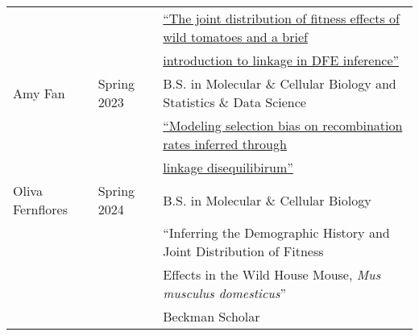 \documentclass[11pt]{article}
\begin{document}
\begin{longtable}[l]{l l l}
&& \href{https://repository.arizona.edu/handle/10150/651036}{``The joint distribution of fitness effects of wild tomatoes and a brief}\\
&& \href{https://repository.arizona.edu/handle/10150/651036}{introduction to linkage in DFE inference''}\\
Amy Fan & Spring 2023 & B.S. in Molecular \& Cellular Biology and Statistics \& Data Science\\
&&\href{https://repository.arizona.edu/handle/10150/669879}{``Modeling selection bias on recombination rates inferred through}\\
&&\href{https://repository.arizona.edu/handle/10150/669879}{linkage disequilibirum''}\\
Oliva Fernflores & Spring 2024 & B.S. in Molecular \& Cellular Biology\\
&&``Inferring the Demographic History and Joint Distribution of Fitness\\
&&Effects in the Wild House Mouse, \textit{Mus musculus domesticus}''\\
&&Beckman Scholar\\
\end{longtable}
\end{document}
